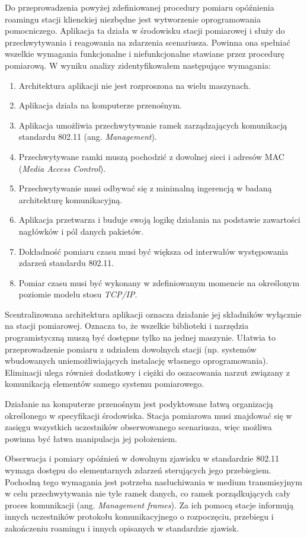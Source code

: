 Do przeprowadzenia powyżej zdefiniowanej procedury pomiaru opóźnienia roamingu stacji klienckiej niezbędne jest wytworzenie oprogramowania pomocniczego. Aplikacja ta działa w środowisku stacji pomiarowej i służy do przechwytywania i reagowania na zdarzenia scenariusza. Powinna ona spełniać wszelkie wymagania funkcjonalne i niefunkcjonalne stawiane przez procedurę pomiarową. W wyniku analizy zidentyfikowałem następujące wymagania: 
\begin{enumerate}
\item Architektura aplikacji nie jest rozproszona na wielu maszynach.
\item Aplikacja działa na komputerze przenośnym.
\item Aplikacja umożliwia przechwytywanie ramek zarządzających komunikacją standardu 802.11 (ang. \emph{Management}). 
\item Przechwytywane ramki muszą pochodzić z dowolnej sieci i adresów MAC (\emph{Media Access Control}).
\item Przechwytywanie musi odbywać się z minimalną ingerencją w badaną architekturę komunikacyjną.
\item Aplikacja przetwarza i buduje swoją logikę działania na podstawie zawartości nagłówków i pól danych pakietów. 
\item Dokładność pomiaru czasu musi być większa od interwałów występowania zdarzeń standardu 802.11.
\item Pomiar czasu musi być wykonany w zdefiniowanym momencie na określonym poziomie modelu stosu \emph{TCP/IP}.
\end{enumerate}

Scentralizowana architektura aplikacji oznacza działanie jej składników wyłącznie na stacji pomiarowej. Oznacza to, że wszelkie biblioteki i narzędzia programistyczną muszą być dostępne tylko na jednej maszynie. Ułatwia to przeprowadzenie pomiaru z udziałem dowolnych stacji (np. systemów wbudowanych uniemożliwiających instalację własnego oprogramowania). Eliminacji ulega również dodatkowy i ciężki do oszacowania narzut związany z komunikacją elementów samego systemu pomiarowego.

Działanie na komputerze przenośnym jest podyktowane łatwą organizacją określonego w specyfikacji środowiska. Stacja pomiarowa musi znajdować się w zasięgu wszystkich uczestników obserwowanego scenariusza, więc możliwa powinna być łatwa manipulacja jej położeniem.

Obserwacja i pomiary opóźnień w dowolnym zjawisku w standardzie 802.11 wymaga dostępu do elementarnych zdarzeń sterujących jego przebiegiem. Pochodną tego wymagania jest potrzeba nasłuchiwania w medium transmisyjnym w celu przechwytywania nie tyle ramek danych, co ramek porządkujących cały proces komunikacji (ang. \emph{Management frames}). Za ich pomocą stacje informują innych uczestników protokołu komunikacyjnego o rozpoczęciu, przebiegu i zakończeniu roamingu i innych opisanych w standardzie zjawisk. 

